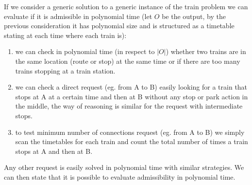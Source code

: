\documentclass[12pt]{article}
\begin{document}
If we consider a generic solution to a generic instance of the train problem we can evaluate if it is admissible in
polynomial time (let $O$ be the output, by the previous consideration it has polynomial size and is structured as a timetable stating at each time where each train is):
\begin{enumerate}
\item we can check in polynomial time (in respect to $|O|$) whether two trains are in the same location (route or stop) at the same time or if there are too many trains stopping at a train station. 
\item we can check a direct request (eg. from A to B) easily looking for a train that stops at A at a certain time and then at B without any stop or park action in the middle, the way of reasoning is similar for the request with intermediate stops.
\item to test minimum number of connections request (eg. from A to B) we simply scan the timetables for each train and count the total number of times a train stops at A and then at B. 
\end{enumerate}


Any other request is easily solved in polynomial time with similar strategies. We can then state that it is possible to evaluate admissibility in polynomial time.
\end{document}
